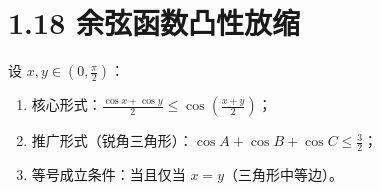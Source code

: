 \documentclass{article}
\begin{document}
\section*{1.18 余弦函数凸性放缩}
设 \( x,y \in (0,\frac{\pi}{2}) \)：
\begin{enumerate}
    \item 核心形式：\( \frac{\cos x+\cos y}{2} \leq \cos\!\left(\frac{x+y}{2}\right) \)；
    \item 推广形式（锐角三角形）：\( \cos A+\cos B+\cos C \leq \frac{3}{2} \)；
    \item 等号成立条件：当且仅当 \( x=y \)（三角形中等边）。
\end{enumerate}
\end{document}
